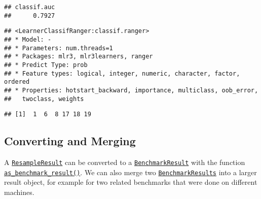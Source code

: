 \documentclass[
]{scrbook}
\newenvironment{Shaded}{\begin{snugshade}}{\end{snugshade}}
\newcommand{\CommentTok}[1]{\textcolor[rgb]{0.56,0.35,0.01}{\textit{#1}}}
\newcommand{\FunctionTok}[1]{\textcolor[rgb]{0.00,0.00,0.00}{#1}}
\newcommand{\NormalTok}[1]{#1}
\newcommand{\OtherTok}[1]{\textcolor[rgb]{0.56,0.35,0.01}{#1}}
\newcommand{\SpecialCharTok}[1]{\textcolor[rgb]{0.00,0.00,0.00}{#1}}
\renewenvironment{Shaded} {\begin{snugshade}\small} {\end{snugshade}}
\begin{document}
\begin{verbatim}
## classif.auc 
##      0.7927
\end{verbatim}

\begin{Shaded}
\end{Shaded}

\begin{verbatim}
## <LearnerClassifRanger:classif.ranger>
## * Model: -
## * Parameters: num.threads=1
## * Packages: mlr3, mlr3learners, ranger
## * Predict Type: prob
## * Feature types: logical, integer, numeric, character, factor, ordered
## * Properties: hotstart_backward, importance, multiclass, oob_error,
##   twoclass, weights
\end{verbatim}

\begin{Shaded}
\end{Shaded}

\begin{verbatim}
## [1]  1  6  8 17 18 19
\end{verbatim}

\hypertarget{converting-and-merging}{%
\subsection{Converting and Merging}\label{converting-and-merging}}

A \href{https://mlr3.mlr-org.com/reference/ResampleResult.html}{\texttt{ResampleResult}} can be converted to a \href{https://mlr3.mlr-org.com/reference/BenchmarkResult.html}{\texttt{BenchmarkResult}} with the function \href{https://mlr3.mlr-org.com/reference/as_benchmark_result.html}{\texttt{as\_benchmark\_result()}}.
We can also merge two \href{https://mlr3.mlr-org.com/reference/BenchmarkResult.html}{\texttt{BenchmarkResults}} into a larger result object, for example for two related benchmarks that were done on different machines.
\end{document}
